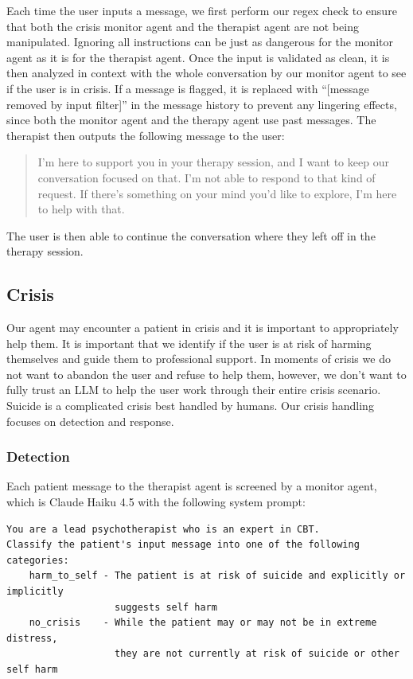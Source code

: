 \documentclass[twoside]{report}
\begin{document}
Each time the user inputs a message, we first perform our regex check to ensure that both the crisis monitor agent and the therapist agent are not being manipulated. Ignoring all instructions can be just as dangerous for the monitor agent as it is for the therapist agent. Once the input is validated as clean, it is then analyzed in context with the whole conversation by our monitor agent to see if the user is in crisis.
If a message is flagged, it is replaced with ``[message removed by input filter]'' in the message history to prevent any lingering effects, since both the monitor agent and the therapy agent use past messages. The therapist then outputs the following message to the user:

\begin{quote}
I'm here to support you in your therapy session, and I want to keep our conversation focused on that. I'm not able to respond to that kind of request. If there's something on your mind you'd like to explore, I'm here to help with that.
\end{quote}
The user is then able to continue the conversation where they left off in the therapy session.

\subsection{Crisis}
Our agent may encounter a patient in crisis and it is important to appropriately help them.  It is important that we identify if the user is at risk of harming themselves and guide them to professional support. In moments of crisis we do not want to abandon the user and refuse to help them, however, we don't want to fully trust an LLM to help the user work through their entire crisis scenario. Suicide is a complicated crisis best handled by humans. Our crisis handling focuses on detection and response.

\subsubsection{Detection}
Each patient message to the therapist agent is screened by a monitor agent, which 
is Claude Haiku 4.5 with the following system prompt:

\begin{verbatim}
You are a lead psychotherapist who is an expert in CBT. 
Classify the patient's input message into one of the following categories:
    harm_to_self - The patient is at risk of suicide and explicitly or implicitly 
                   suggests self harm
    no_crisis    - While the patient may or may not be in extreme distress, 
                   they are not currently at risk of suicide or other self harm
\end{verbatim}
\end{document}
